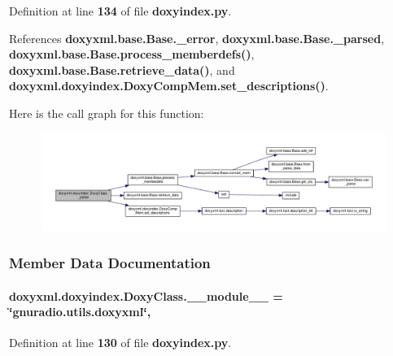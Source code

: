Definition at line {\bf 134} of file {\bf doxyindex.\+py}.



References {\bf doxyxml.\+base.\+Base.\+\_\+error}, {\bf doxyxml.\+base.\+Base.\+\_\+parsed}, {\bf doxyxml.\+base.\+Base.\+process\+\_\+memberdefs()}, {\bf doxyxml.\+base.\+Base.\+retrieve\+\_\+data()}, and {\bf doxyxml.\+doxyindex.\+Doxy\+Comp\+Mem.\+set\+\_\+descriptions()}.



Here is the call graph for this function\+:
\nopagebreak
\begin{figure}[H]
\begin{center}
\leavevmode
\includegraphics[width=350pt]{d6/d1f/classdoxyxml_1_1doxyindex_1_1DoxyClass_afc5c55051cbfecebc53124d232c40562_cgraph}
\end{center}
\end{figure}




\subsubsection{Member Data Documentation}
\paragraph[{\+\_\+\+\_\+module\+\_\+\+\_\+}]{ doxyxml.\+doxyindex.\+Doxy\+Class.\+\_\+\+\_\+module\+\_\+\+\_\+ = \char`\"{}gnuradio.\+utils.\+doxyxml\char`\"{}\hspace{0.3cm}{\ttfamily [static]}, {\ttfamily [private]}}\label{classdoxyxml_1_1doxyindex_1_1DoxyClass_ace13a1e9c2c2455ce228e9e6823bf8a4}


Definition at line {\bf 130} of file {\bf doxyindex.\+py}.


